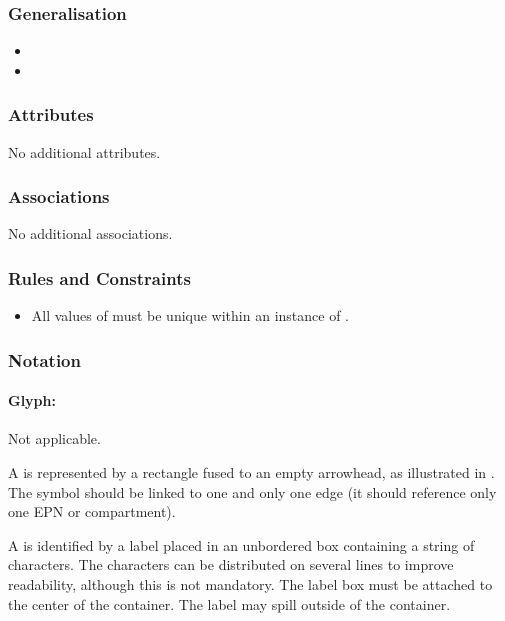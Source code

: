 \subsubsection{Generalisation}

\begin{itemize}
\item {}
\item {}
\end{itemize}

\subsubsection{Attributes}

No additional attributes.

\subsubsection{Associations}

No additional associations.

\subsubsection{Rules and Constraints}

\begin{itemize}
\item All values of  must be unique within an
  instance of .
\end{itemize}

\subsubsection{Notation}

\paragraph{Glyph: }
\label{sec:tag}

\begin{glyphDescription}

\glyphSboTerm Not applicable.

\glyphContainer A  is represented by a rectangle fused to an empty arrowhead, as illustrated in .  The symbol should be linked to one and only one edge (\ie it should reference only one EPN or compartment).

\glyphLabel A  is identified by a label placed in an unbordered box containing a string of characters.  The characters can be distributed on several lines to improve readability, although this is not mandatory.  The label box must be attached to the center of the container. The label may spill outside of the container.

\end{glyphDescription}

